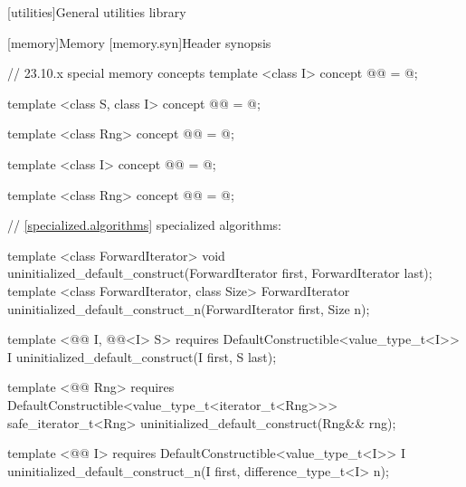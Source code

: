 \setcounter{chapter}{22}
[utilities]{General utilities library}

\setcounter{section}{9}
[memory]{Memory}
\setcounter{subsection}{1}
[memory.syn]{Header  synopsis}

{\color{addclr}
\begin{codeblock}
// 23.10.x special memory concepts
template <class I>
concept @@ = @\seebelow@;

template <class S, class I>
concept @@ = @\seebelow@;

template <class Rng>
concept @@ = @\seebelow@;

template <class I>
concept @@ = @\seebelow@;

template <class Rng>
concept @@ = @\seebelow@;
\end{codeblock}
} %

\begin{codeblock}
// \ref{specialized.algorithms} specialized algorithms:
\end{codeblock}
{\color{remclr}
\begin{codeblock}
template <class ForwardIterator>
  void uninitialized_default_construct(ForwardIterator first, ForwardIterator last);
template <class ForwardIterator, class Size>
  ForwardIterator uninitialized_default_construct_n(ForwardIterator first, Size n);
\end{codeblock}
} %
{\color{addclr}
\begin{codeblock}
template <@@ I, @@<I> S>
  requires
DefaultConstructible<value_type_t<I>>
  I uninitialized_default_construct(I first, S last);

template <@@ Rng>
  requires
DefaultConstructible<value_type_t<iterator_t<Rng>>>
  safe_iterator_t<Rng> uninitialized_default_construct(Rng&& rng);

template <@@ I>
  requires
DefaultConstructible<value_type_t<I>>
  I uninitialized_default_construct_n(I first, difference_type_t<I> n);
\end{codeblock}
} %

